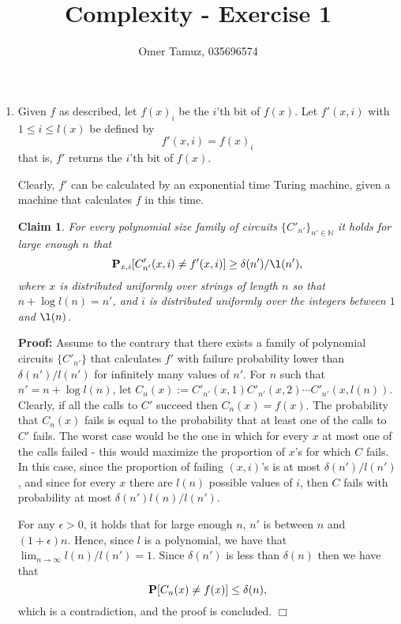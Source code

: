 \documentclass[11pt]{article} \usepackage{amssymb}
\newtheorem{claim}[theorem]{Claim}
\newenvironment{proof}{\noindent \textbf{Proof:}}{$\Box$}
\newcommand{\N}{\mathbb N} \newcommand{\R}{\mathbb R}
\begin{document}
\title{Complexity - Exercise 1}

 \author{Omer Tamuz, 035696574}
\maketitle


\begin{enumerate}
\item
Given $f$ as described, let $f(x)_i$ be the $i$'th bit of $f(x)$. 
Let $f'(x,i)$ with $1\leq i \leq l(x)$ be defined by
$$f'(x,i)=f(x)_i$$
that is, $f'$ returns the $i$'th bit of $f(x)$.

Clearly, $f'$ can be calculated by an exponential time Turing machine, given
a machine that calculates $f$ in this time.

\begin{claim}
  For every polynomial size family of circuits $\{C'_{n'}\}_{n'\in \N}$ 
  it holds for large enough $n$ that
$$\P_{x,i}[C'_{n'}(x,i)\neq f'(x,i)]\geq \delta(n')/\l(n'),$$
where $x$ is distributed uniformly over strings of length $n$ so that
$n+\log l(n)=n'$, and $i$ is
distributed uniformly over the integers between $1$ and $\l(n)$.
\end{claim}
\begin{proof}
Assume to the contrary that there exists a family of polynomial circuits
$\{C'_{n'}\}$ that 
calculates $f'$ with failure probability lower than $\delta(n')/l(n')$ for infinitely many
values of $n'$. 
For $n$ such that  $n'=n+\log l(n)$, let 
$C_{n}(x):=C'_{n'}(x,1)C'_{n'}(x,2)\cdots C'_{n'}(x,l(n))$. Clearly, if all the calls to $C'$ succeed then
$C_n(x)=f(x)$. The probability that $C_n(x)$ fails
is equal to the probability that at least one of the calls to $C'$ fails. 
The worst case would be the one in which for every $x$ at most one of the calls
failed - this would maximize the proportion of $x$'s for which $C$ fails.
In this case, since the proportion of failing $(x,i)$'s is at most
$\delta(n')/l(n')$, and since for every $x$ there are $l(n)$ possible
values of $i$, then $C$ fails with probability at most $\delta(n')l(n)/l(n')$.

For any $\epsilon>0$, it holds that for large enough $n$, $n'$ is between $n$ 
and $(1+\epsilon)n$. Hence, since $l$ is a polynomial, we have that
$\lim_{n\to\infty}l(n)/l(n')=1$. Since $\delta(n')$ is less than $\delta(n)$
then we have that
\begin{equation*}
  \P[C_n(x)\neq f(x)] \leq \delta(n),
\end{equation*}
which is a contradiction, and the proof is concluded.
\end{proof}


\end{enumerate}
\end{document}
